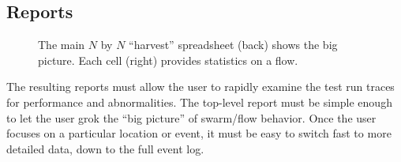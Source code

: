 \documentclass[conference]{IEEEtran}
\begin{document}



\subsection{Reports}

\begin{figure}[t]
\setlength\fboxsep{0pt}
\setlength\fboxrule{0.5pt}
%
\makebox[150pt][l]{}
\caption{The main $N$ by $N$ ``harvest'' spreadsheet (back) shows the big picture. Each cell (right) provides statistics on a flow.}
\label{fig:swarm}
\end{figure}

The resulting reports must allow the user to rapidly examine the test run traces for performance and abnormalities. The top-level report must be simple enough to let the user grok the ``big picture'' of swarm/flow behavior. Once the user focuses on a particular location or event, it must be easy to switch fast to more detailed data, down to the full event log.
\end{document}
